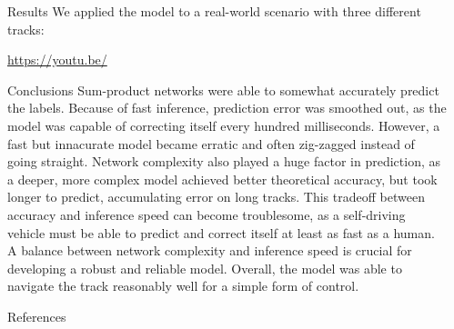 \documentclass[final,hyperref={pdfpagelabels=false},notheorems]{beamer}
\theoremstyle{thesisstyle}
\begin{document}
\begin{frame}[t]
\begin{columns}[t]
\begin{column}{.5\textwidth}
\begin{block}{Results}
      We applied the model to a real-world scenario with three different tracks:\\
      \begin{center}
        \url{https://youtu.be/}
      \end{center}
    \end{block}

    \begin{block}{Conclusions}
      Sum-product networks were able to somewhat accurately predict the labels. Because of fast
      inference, prediction error was smoothed out, as the model was capable of correcting itself
      every hundred milliseconds. However, a fast but innacurate model became erratic and often
      zig-zagged instead of going straight. Network complexity also played a huge factor in
      prediction, as a deeper, more complex model achieved better theoretical accuracy, but took
      longer to predict, accumulating error on long tracks.  This tradeoff between accuracy and
      inference speed can become troublesome, as a self-driving vehicle must be able to predict and
      correct itself at least as fast as a human. A balance between network complexity and
      inference speed is crucial for developing a robust and reliable model.  Overall, the model
      was able to navigate the track reasonably well for a simple form of control.
    \end{block}

    \begin{block}{References}
      \linespread{0.928}\selectfont
      \printbibliography[heading=none]
    \end{block}

  \end{column}

  \begin{column}{.015\textwidth}\end{column} %

\end{columns} %

\end{frame} %
\end{document}
